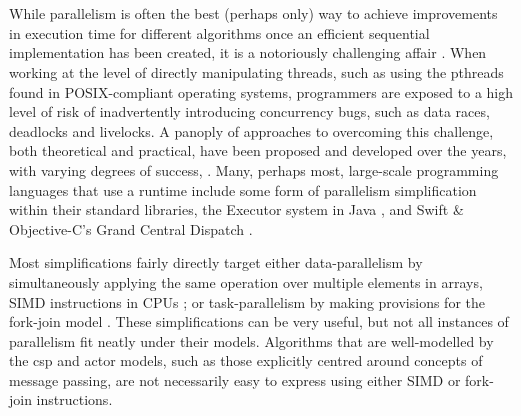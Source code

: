 \section{\label{sec:lr:cml}}


While parallelism is often the best (perhaps only) way to achieve improvements in execution time for different algorithms once an efficient sequential implementation has been created, it is a notoriously challenging affair \cite{Shun2017}.  When working at the level of directly manipulating threads, such as using the pthreads found in POSIX-compliant operating systems, programmers are exposed to a high level of risk of inadvertently introducing concurrency bugs, such as data races, deadlocks and livelocks.  A panoply of approaches to overcoming this challenge, both theoretical and practical, have been proposed and developed over the years, with varying degrees of success, \eg{} \cite{Boyapati2002,Bocq2012,Seinstra2004}.  Many, perhaps most, large-scale programming languages that use a runtime include some form of parallelism simplification within their standard libraries, \eg{} the Executor system in Java \cite[Ch. 4]{Fernandez2012}, and Swift \& Objective-C's Grand Central Dispatch \cite{Maskrey2018}.

Most simplifications fairly directly target either data-parallelism by simultaneously applying the same operation over multiple elements in arrays, \eg{} SIMD instructions in CPUs \cite{Hughes2015}; or task-parallelism by making provisions for the fork-join model \cite{McCool2012}.  These simplifications can be very useful, but not all instances of parallelism fit neatly under their models.  Algorithms that are well-modelled by the \Gls{csp} and \Gls{actor} models, such as those explicitly centred around concepts of message passing, are not necessarily easy to express using either SIMD or fork-join instructions.

